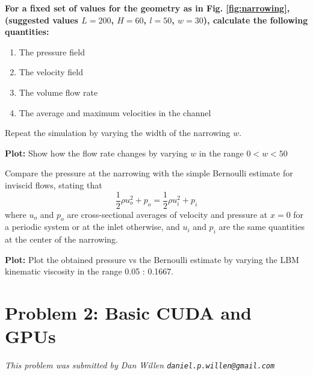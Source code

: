 \documentclass[11pt]{article}
\begin{document}
    \begin{solution}
        
    \end{solution}

    
    \textbf{For a fixed set of values for the geometry 
    as in Fig. \ref{fig:narrowing}, (suggested values $L=200$, $H=60$, $l=50$, $w=30$), 
    calculate the following quantities:}
    \begin{enumerate}
      \item The pressure field
      \item The velocity field 
      \item The volume flow rate 
      \item The average and maximum velocities in the channel
    \end{enumerate}
    \begin{solution}
        
    \end{solution}

    Repeat the simulation by varying the width of the narrowing $w$.
    
    \textbf{Plot:}
    Show how the flow rate changes by varying $w$ in the range $0<w<50$
    
    Compare the pressure at the narrowing with the simple Bernoulli estimate for inviscid flows, stating that
    $$
    \frac{1}{2} \rho u_o^2 + p_o = \frac{1}{2} \rho u_i^2 + p_i
    $$
    where $u_o$ and $p_o$ are cross-sectional averages of velocity and pressure at $x=0$ for a periodic system 
    or at the inlet otherwise, and $u_i$ and $p_i$ are the same quantities at the center of the narrowing.
    
    \begin{solution}
        
    \end{solution}
    
    \textbf{Plot:}
    Plot the obtained pressure vs the Bernoulli estimate by varying the LBM kinematic viscosity in the range 0.05 : 0.1667.
    \begin{solution}
        
    \end{solution}
    


\newpage
  \section{Problem 2:  Basic CUDA and GPUs}
    \textit{This problem was submitted by Dan Willen \texttt{daniel.p.willen@gmail.com}}
\end{document}
